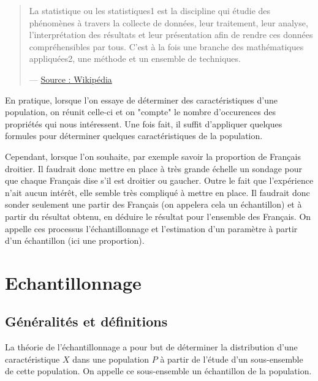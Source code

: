 
\minitoc  %

\begin{quote}
    La statistique ou les statistiques1 est la discipline qui étudie des phénomènes à 
    travers la collecte de données, leur traitement, leur analyse, l'interprétation des 
    résultats et leur présentation afin de rendre ces données compréhensibles par tous. 
    C'est à la fois une branche des mathématiques appliquées2, une méthode et un ensemble de techniques. 

    \hfill --- \href{https://fr.wikipedia.org/wiki/Statistique}{Source : Wikipédia}
\end{quote}

En pratique, lorsque l'on essaye de déterminer des caractéristiques d'une population, 
on réunit celle-ci et on "compte" le nombre d'occurences des propriétés qui nous intéressent. 
Une fois fait, il suffit d'appliquer quelques formules pour déterminer quelques caractéristiques 
de la population. 

Cependant, lorsque l'on souhaite, par exemple savoir la proportion de Français droitier. Il faudrait donc 
mettre en place à très grande échelle un sondage pour que chaque Français dise s'il est droitier ou gaucher. 
Outre le fait que l'expérience n'ait aucun intérêt, elle semble très compliqué à mettre en place. 
Il faudrait donc sonder seulement une partir des Français (on appelera cela un échantillon) et à partir du 
résultat obtenu, en déduire le résultat pour l'ensemble des Français. On appelle ces processus l'échantillonnage 
et l'estimation d'un paramètre à partir d'un échantillon (ici une proportion). 


\section{Echantillonnage}

\subsection{Généralités et définitions}

La théorie de l'échantillonnage a pour but de déterminer la distribution d'une caractéristique $X$ dans une 
population $P$ à partir de l'étude d'un sous-ensemble de cette population. On appelle ce sous-ensemble un 
échantillon de la population. 

